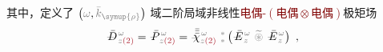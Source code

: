 其中，定义了 $\left( \mathcolor{gray}{\omega}, \mathcolor{gray}{\bar{k}_{\symup{\rho}}} \right)$ 域二阶局域非线性\textcolor{Maroon}{电偶-$(\text{电偶}\otimes\text{电偶})$}极矩场
\begin{align} \label{eq:vec-DP^(2)-p_pp}
	\Xint{\mathcolor{gray}{-}}{30}{\bar{D}}^{\;\! \mathcolor{gray}{\omega}}_{\;\! \mathcolor{gray}{z} \textcolor{Maroon}{(2)}} &= \Xint{\mathcolor{gray}{-}}{30}{\bar{P}}^{\;\! \mathcolor{gray}{\omega}}_{\;\! \mathcolor{gray}{z} \textcolor{Maroon}{(2)}} = \Xint{{}^{}_{\mathcolor{gray}{-}}}{23}{\bar{\bar{\bar{\chi}}}}^{\;\! \mathcolor{gray}{\omega}}_{\mathcolor{gray}{z} \textcolor{Maroon}{(2)}} ~{}^{\mathcolor{gray}{*}}_{\mathcolor{gray}{*}} \left( \Xint{\mathcolor{gray}{-}}{295}{\bar{E}}^{\;\!\mathcolor{gray}{\omega}}_{\;\! \mathcolor{gray}{z}} ~\mathcolor{gray}{\widetilde \circledast}~ \Xint{\mathcolor{gray}{-}}{295}{\bar{E}}^{\;\!\mathcolor{gray}{\omega}}_{\;\! \mathcolor{gray}{z}} \right) ~,
\end{align}

